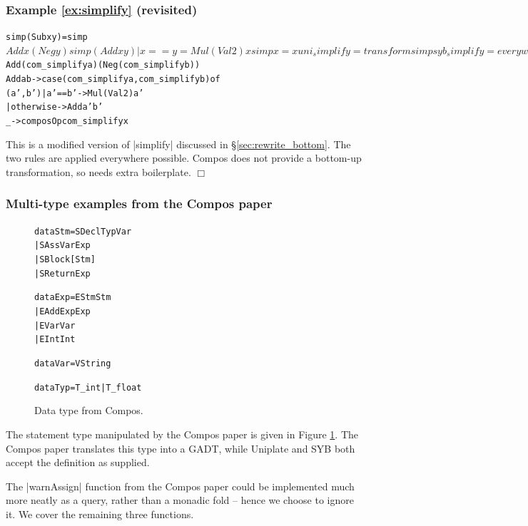 \documentclass[preprint]{sigplanconf}
\newcommand{\noexample}{\hfill$\Box$}
\newenvironment{code}{\begin{alltt}\small}{\end{alltt}}
\newenvironment{revisit}[1]{\subsubsection*{Example #1 (revisited)}}{\noexample}
\newcommand{\ignore}{}
\begin{document}
\begin{revisit}{\ref{ex:simplify}}

\ignore\begin{code}
simp (Sub x y)           = simp $ Add x (Neg y)
simp (Add x y) | x == y  = Mul (Val 2) x
simp x                   = x

uni_simplify = transform simp

syb_simplify = everywhere (mkT simp)

com_simplify :: Expr a -> Expr a
com_simplify x = case x of
    Sub  a b -> com_simplify $
        Add (com_simplify a) (Neg (com_simplify b))
    Add  a b -> case  (com_simplify a, com_simplify b) of
                      (a',b')  | a' == b'   -> Mul (Val 2) a'
                               | otherwise  -> Add a' b'
    _ -> composOp com_simplify x
\end{code}

This is a modified version of |simplify| discussed in \S\ref{sec:rewrite_bottom}. The two rules are applied everywhere possible. Compos does not provide a bottom-up transformation, so needs extra boilerplate.
\end{revisit}

\subsubsection{Multi-type examples from the Compos paper}

\begin{figure}
\ignore\begin{code}
data Stm  =  SDecl    Typ Var
          |  SAss     Var Exp
          |  SBlock   [Stm]
          |  SReturn  Exp

data Exp  =  EStm  Stm
          |  EAdd  Exp Exp
          |  EVar  Var
          |  EInt  Int

data Var  =  V String

data Typ  =  T_int | T_float
\end{code}
\caption{Data type from Compos.}
\label{fig:compos}
\end{figure}

The statement type manipulated by the Compos paper is given in Figure \ref{fig:compos}. The Compos paper translates this type into a GADT, while Uniplate and SYB both accept the definition as supplied.

The |warnAssign| function from the Compos paper could be implemented much more neatly as a query, rather than a monadic fold -- hence we choose to ignore it. We cover the remaining three functions.
\end{document}
